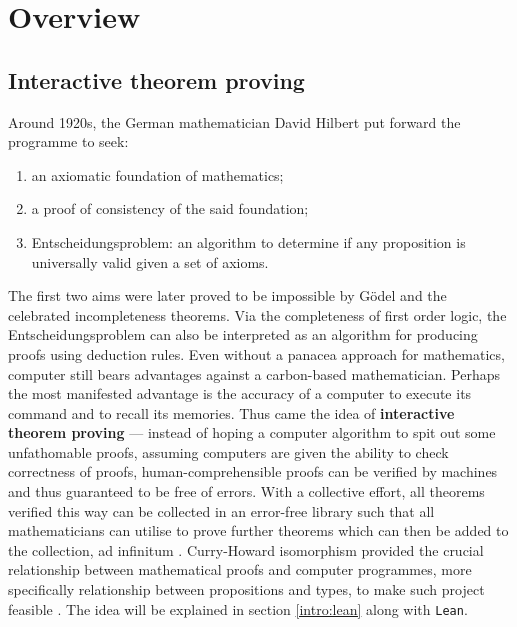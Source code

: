 \documentclass{report}
\theoremstyle{definition}
\begin{document}
\tableofcontents

\chapter{Overview}
\section{Interactive theorem proving}
Around 1920s, the German mathematician David Hilbert put forward the programme to seek:
\begin{enumerate}
  \item an axiomatic foundation of mathematics;
  \item a proof of consistency of the said foundation;
  \item Entscheidungsproblem: an algorithm to determine if any proposition is universally valid given a set of axioms.
\end{enumerate}
The first two aims were later proved to be impossible by Gödel and the celebrated incompleteness theorems. Via the completeness of first order logic, the Entscheidungsproblem can also be interpreted as an algorithm for producing proofs using deduction rules. Even without a panacea approach for mathematics, computer still bears advantages against a carbon-based mathematician. Perhaps the most manifested advantage is the accuracy of a computer to execute its command and to recall its memories. Thus came the idea of {\bf interactive theorem proving} --- instead of hoping a computer algorithm to spit out some unfathomable proofs, assuming computers are given the ability to check correctness of proofs, human-comprehensible proofs can be verified by machines and thus guaranteed to be free of errors. With a collective effort, all theorems verified this way can be collected in an error-free library such that all mathematicians can utilise to prove further theorems which can then be added to the collection, ad infinitum \cite{boyer1994qed}. Curry-Howard isomorphism provided the crucial relationship between mathematical proofs and computer programmes, more specifically relationship between propositions and types, to make such project feasible \cite{kennedy2011set}. The idea will be explained in section \ref{intro:lean} along with {\tt \small Lean}. 
\end{document}
